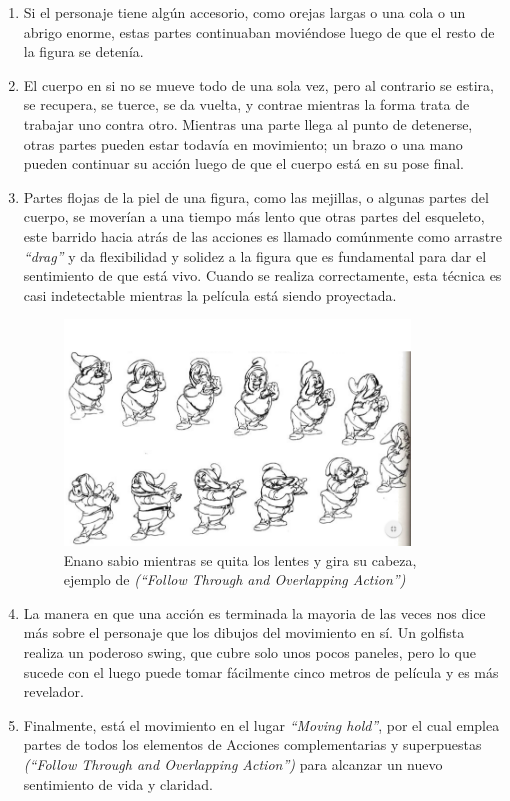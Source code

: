 \documentclass[a4paper,12pt]{report}
\begin{document}
 
\begin{enumerate}
    \item Si el personaje tiene algún accesorio, como orejas largas o una cola o un abrigo enorme, estas partes continuaban moviéndose luego de que el resto de la figura se detenía.
    \item El cuerpo en si no se mueve todo de una sola vez, pero al contrario se estira, se recupera, se tuerce, se da vuelta, y contrae mientras la forma trata de trabajar uno contra otro. Mientras una parte llega al punto de detenerse, otras partes pueden estar todavía en movimiento; un brazo o una mano pueden continuar su acción luego de que el cuerpo está en su pose final.
    \item Partes flojas de la piel de una figura, como las mejillas, o algunas partes del cuerpo, se moverían a una tiempo más lento que otras partes del esqueleto, este barrido hacia atrás de las acciones es llamado comúnmente como arrastre \textit{``drag''} y da flexibilidad y solidez a la figura que es fundamental para dar el sentimiento de que está vivo. Cuando se realiza correctamente, esta técnica es casi indetectable mientras la película está siendo proyectada.
    
 
    \begin{figure}[ht]
        \centering
        \includegraphics[height=6cm]{Imagenes/enano_sabio}
        \caption{Enano sabio mientras se quita los lentes y gira su cabeza, ejemplo de \textit{(``Follow Through and Overlapping Action'')}}
        \label{fig:enano_sabio}
    \end{figure}
 
 
    \item La manera en que una acción es terminada la mayoria de las veces nos dice más sobre el personaje que los dibujos del movimiento en sí. Un golfista realiza un poderoso swing, que cubre solo unos pocos paneles, pero lo que sucede con el luego puede tomar fácilmente cinco metros de película y es más revelador.
    \item Finalmente, está el movimiento en el lugar \textit{``Moving hold''}, por el cual emplea partes de todos los elementos de Acciones complementarias y superpuestas \textit{(``Follow Through and Overlapping Action'')} para alcanzar un nuevo sentimiento de vida y claridad.\cite{principles_animation}
 

\end{enumerate}
\end{document}
